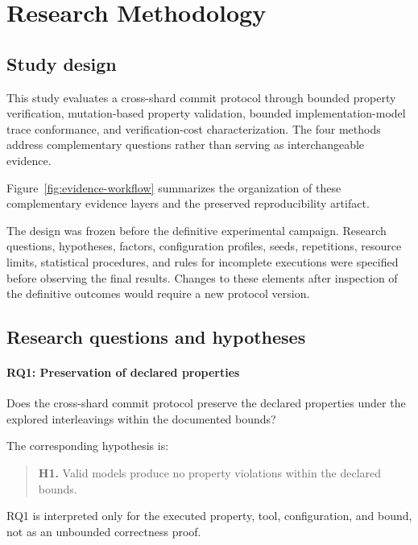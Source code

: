 \section{Research Methodology}
\label{sec:methodology}

\subsection{Study design}
\label{subsec:study-design}

This study evaluates a cross-shard commit protocol through bounded property
verification, mutation-based property validation, bounded implementation-model
trace conformance, and verification-cost characterization. The four methods
address complementary questions rather than serving as interchangeable
evidence.

Figure~\ref{fig:evidence-workflow} summarizes the organization of these
complementary evidence layers and the preserved reproducibility artifact.


The design was frozen before the definitive experimental campaign. Research
questions, hypotheses, factors, configuration profiles, seeds, repetitions,
resource limits, statistical procedures, and rules for incomplete executions
were specified before observing the final results. Changes to these elements
after inspection of the definitive outcomes would require a new protocol
version.

\subsection{Research questions and hypotheses}
\label{subsec:research-questions}

\paragraph{RQ1: Preservation of declared properties}

Does the cross-shard commit protocol preserve the declared properties under the
explored interleavings within the documented bounds?

The corresponding hypothesis is:

\begin{quote}
\textbf{H1.} Valid models produce no property violations within the declared
bounds.
\end{quote}

RQ1 is interpreted only for the executed property, tool, configuration, and
bound, not as an unbounded correctness proof.


